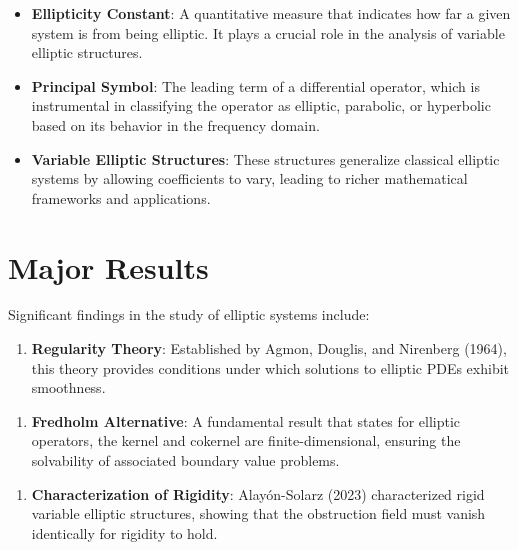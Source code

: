 \documentclass[11pt,a4paper]{article}
\begin{document}
\begin{itemize}
\item \textbf{Ellipticity Constant}: A quantitative measure that indicates how far a given system is from being elliptic. It plays a crucial role in the analysis of variable elliptic structures.
\end{itemize}

\begin{itemize}
\item \textbf{Principal Symbol}: The leading term of a differential operator, which is instrumental in classifying the operator as elliptic, parabolic, or hyperbolic based on its behavior in the frequency domain.
\end{itemize}

\begin{itemize}
\item \textbf{Variable Elliptic Structures}: These structures generalize classical elliptic systems by allowing coefficients to vary, leading to richer mathematical frameworks and applications.
\end{itemize}

\section{Major Results}

Significant findings in the study of elliptic systems include:

\begin{enumerate}
\item \textbf{Regularity Theory}: Established by Agmon, Douglis, and Nirenberg (1964), this theory provides conditions under which solutions to elliptic PDEs exhibit smoothness.
\end{enumerate}

\begin{enumerate}
\item \textbf{Fredholm Alternative}: A fundamental result that states for elliptic operators, the kernel and cokernel are finite-dimensional, ensuring the solvability of associated boundary value problems.
\end{enumerate}

\begin{enumerate}
\item \textbf{Characterization of Rigidity}: Alayón-Solarz (2023) characterized rigid variable elliptic structures, showing that the obstruction field must vanish identically for rigidity to hold.
\end{enumerate}
\end{document}
